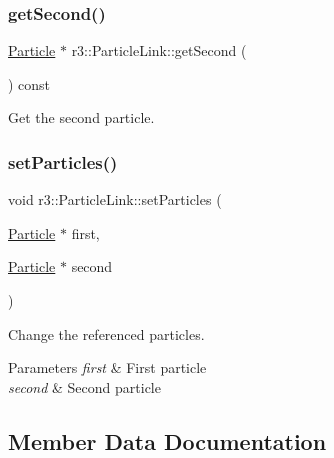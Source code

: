 \subsubsection{\texorpdfstring{get\+Second()}{getSecond()}}
{\footnotesize\ttfamily \mbox{\hyperlink{classr3_1_1_particle}{Particle}} $\ast$ r3\+::\+Particle\+Link\+::get\+Second (\begin{DoxyParamCaption}{ }\end{DoxyParamCaption}) const}



Get the second particle. 

\mbox{\label{classr3_1_1_particle_link_a6c199dcab0ac23674e0069e54bd841c4}} 
\subsubsection{\texorpdfstring{set\+Particles()}{setParticles()}}
{\footnotesize\ttfamily void r3\+::\+Particle\+Link\+::set\+Particles (\begin{DoxyParamCaption}\item[{\mbox{\hyperlink{classr3_1_1_particle}{Particle}} $\ast$}]{first,  }\item[{\mbox{\hyperlink{classr3_1_1_particle}{Particle}} $\ast$}]{second }\end{DoxyParamCaption})}



Change the referenced particles. 


\begin{DoxyParams}{Parameters}
{\em first} & First particle \\
\hline
{\em second} & Second particle \\
\hline
\end{DoxyParams}


\subsection{Member Data Documentation}
\mbox{\label{classr3_1_1_particle_link_a2794d7fe45d905d9c11bb79be3d8e3c8}} 
